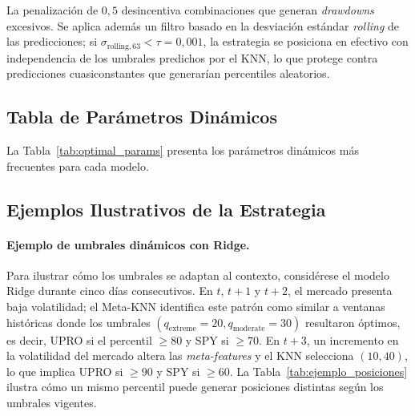 \noindent La penalizaci\'on de $0{,}5$ desincentiva combinaciones que generan \textit{drawdowns} excesivos. Se aplica adem\'as un filtro basado en la desviaci\'on est\'andar \textit{rolling} de las predicciones; si $\sigma_{\text{rolling},63} < \tau = 0{,}001$, la estrategia se posiciona en efectivo con independencia de los umbrales predichos por el KNN, lo que protege contra predicciones cuasiconstantes que generar\'ian percentiles aleatorios.

\subsection{Tabla de Par\'ametros Din\'amicos}
\label{app:optimal_table}

La Tabla~\ref{tab:optimal_params} presenta los par\'ametros din\'amicos m\'as frecuentes para cada modelo.



\subsection{Ejemplos Ilustrativos de la Estrategia}
\label{sec:appendix_strategy_examples}

\paragraph{Ejemplo de umbrales din\'amicos con Ridge.} Para ilustrar c\'omo los umbrales se adaptan al contexto, consid\'erese el modelo Ridge durante cinco d\'ias consecutivos. En $t$, $t{+}1$ y $t{+}2$, el mercado presenta baja volatilidad; el Meta-KNN identifica este patr\'on como similar a ventanas hist\'oricas donde los umbrales $(q_{\text{extreme}}{=}20, q_{\text{moderate}}{=}30)$ resultaron \'optimos, es decir, UPRO si el percentil $\geq 80$ y SPY si $\geq 70$. En $t{+}3$, un incremento en la volatilidad del mercado altera las \textit{meta-features} y el KNN selecciona $(10, 40)$, lo que implica UPRO si $\geq 90$ y SPY si $\geq 60$. La Tabla~\ref{tab:ejemplo_posiciones} ilustra c\'omo un mismo percentil puede generar posiciones distintas seg\'un los umbrales vigentes.

